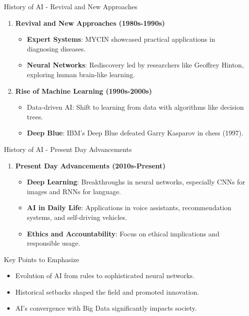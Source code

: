 \documentclass[aspectratio=169]{beamer}
\begin{document}
\begin{frame}[fragile]{History of AI - Revival and New Approaches}
    \begin{enumerate}
        \item \textbf{Revival and New Approaches (1980s-1990s)}
            \begin{itemize}
                \item \textbf{Expert Systems}: MYCIN showcased practical applications in diagnosing diseases.
                \item \textbf{Neural Networks}: Rediscovery led by researchers like Geoffrey Hinton, exploring human brain-like learning.
            \end{itemize}
        
        \item \textbf{Rise of Machine Learning (1990s-2000s)}
            \begin{itemize}
                \item Data-driven AI: Shift to learning from data with algorithms like decision trees.
                \item \textbf{Deep Blue}: IBM’s Deep Blue defeated Garry Kasparov in chess (1997).
            \end{itemize}
    \end{enumerate}
\end{frame}

\begin{frame}[fragile]{History of AI - Present Day Advancements}
    \begin{enumerate}
        \item \textbf{Present Day Advancements (2010s-Present)}
            \begin{itemize}
                \item \textbf{Deep Learning}: Breakthroughs in neural networks, especially CNNs for images and RNNs for language.
                \item \textbf{AI in Daily Life}: Applications in voice assistants, recommendation systems, and self-driving vehicles.
                \item \textbf{Ethics and Accountability}: Focus on ethical implications and responsible usage.
            \end{itemize}
    \end{enumerate}
    
    \begin{block}{Key Points to Emphasize}
        \begin{itemize}
            \item Evolution of AI from rules to sophisticated neural networks.
            \item Historical setbacks shaped the field and promoted innovation.
            \item AI's convergence with Big Data significantly impacts society.
        \end{itemize}
    \end{block}
\end{frame}
\end{document}
